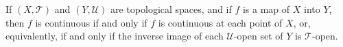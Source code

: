If $(X, \mathcal{T})$ and $(Y, \mathcal{U})$ are topological spaces, and if $f$ is a map of $X$ into $Y$, then $f$ is continuous if and only if $f$ is continuous at each point of $X$, or, equivalently, if and only if the inverse image of each $\mathcal{U}$-open set of $Y$ is $\mathcal{T}$-open.
